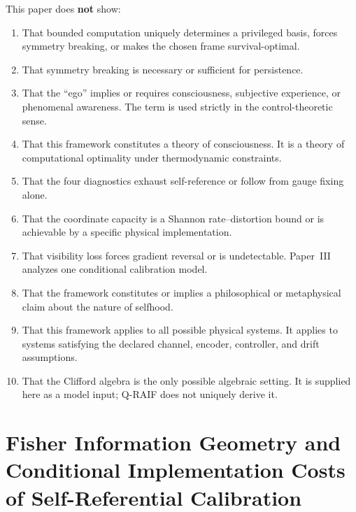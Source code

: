 \documentclass[12pt,a4paper,openany]{book}
\begin{document}
\medskip
This paper does \textbf{not} show:
\begin{enumerate}
\item That bounded computation uniquely determines a privileged basis,
  forces symmetry breaking, or makes the chosen frame survival-optimal.
\item That symmetry breaking is necessary or sufficient for persistence.
\item That the ``ego'' implies or requires consciousness,
  subjective experience, or phenomenal awareness.
  The term is used strictly in the control-theoretic sense.
\item That this framework constitutes a theory of
  consciousness. It is a theory of computational optimality
  under thermodynamic constraints.
\item That the four diagnostics exhaust self-reference or follow from
  gauge fixing alone.
\item That the coordinate capacity is a Shannon rate--distortion bound or
  is achievable by a specific physical implementation.
\item That visibility loss forces gradient reversal or is undetectable.
  Paper~III analyzes one conditional calibration model.
\item That the framework constitutes or implies a
  philosophical or metaphysical claim about the nature
  of selfhood.
\item That this framework applies to all possible physical
  systems. It applies to systems
  satisfying the declared channel, encoder, controller, and drift
  assumptions.
\item That the Clifford algebra is the only possible
  algebraic setting. It is supplied here as a model input; Q-RAIF does
  not uniquely derive it.
\end{enumerate}


\chapter{Fisher Information Geometry and Conditional Implementation Costs of Self-Referential Calibration}
\label{T-chap:paperIII}
\end{document}
